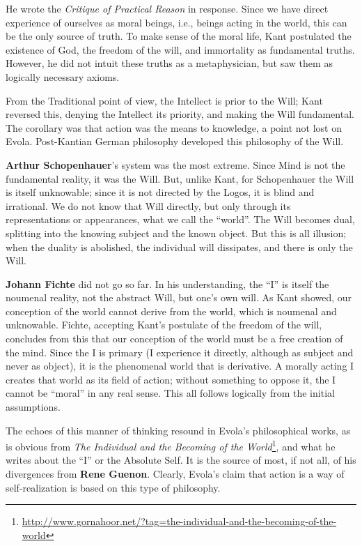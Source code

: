 He wrote the \textit{Critique of Practical Reason} in response. Since we have direct experience of ourselves as moral beings,
i.e., beings acting in the world, this can be the only source of truth. To make sense of the moral life, Kant
postulated the existence of God, the freedom of the will, and immortality as fundamental truths. However, he did not
intuit these truths as a metaphysician, but saw them as logically necessary axioms.

From the Traditional point of view, the Intellect is prior to the Will; Kant reversed this, denying the Intellect its
priority, and making the Will fundamental. The corollary was that action was the means to knowledge, a point not lost
on Evola. Post-Kantian German philosophy developed this philosophy of the Will.

\textbf{Arthur Schopenhauer}'s system was the most extreme. Since Mind is not the fundamental reality, it
was the Will. But, unlike Kant, for Schopenhauer the Will is itself unknowable; since it is not directed by the Logos,
it is blind and irrational. We do not know that Will directly, but only through its representations or appearances,
what we call the “world”. The Will becomes dual, splitting into the knowing subject and the known object. But this is
all illusion; when the duality is abolished, the individual will dissipates, and there is only the Will.

\textbf{Johann Fichte} did not go so far. In his understanding, the “I” is itself the noumenal reality, not the abstract
Will, but one's own will. As Kant showed, our conception of the world cannot derive from the world, which
is noumenal and unknowable. Fichte, accepting Kant's postulate of the freedom of the will, concludes from
this that our conception of the world must be a free creation of the mind. Since the I is primary (I experience it
directly, although as subject and never as object), it is the phenomenal world that is derivative. A morally acting I
creates that world as its field of action; without something to oppose it, the I cannot be “moral” in any real sense.
This all follows logically from the initial assumptions.

The echoes of this manner of thinking resound in Evola's philosophical works, as is obvious from \textit{The
Individual and the Becoming of the World}\footnote{\url{http://www.gornahoor.net/?tag=the-individual-and-the-becoming-of-the-world}}, and what he writes about the “I” or the Absolute Self. It is the source of
most, if not all, of his divergences from \textbf{Rene Guenon}. Clearly, Evola's claim that action is a way
of self-realization is based on this type of philosophy.

